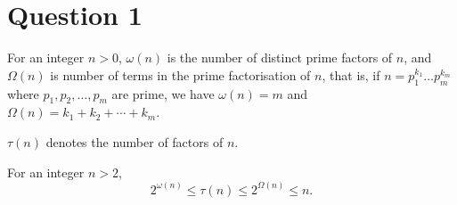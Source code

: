 \documentclass{unswmaths}
\begin{document}
\fancyfoot[r]{\today}

\section*{Question 1}

\begin{unswdef}
    For an integer $n > 0$, $\omega(n)$ is the number of distinct prime factors of $n$, and $\Omega(n)$
    is number of terms in the prime factorisation of $n$, that is, if $n = p_1^{k_1}\ldots p_m^{k_m}$
    where $p_1,p_2,\ldots,p_m$ are prime, we have $\omega(n) = m$ and $\Omega(n) = k_1+k_2+\cdots+k_m$.
    
    $\tau(n)$ denotes the number of factors of $n$.
\end{unswdef}
\begin{unswlem}
    For an integer $n > 2$,
    \begin{equation*}
        2^{\omega(n)}\leq \tau(n) \leq 2^{\Omega(n)}\leq n.
    \end{equation*}
\end{unswlem}
\end{document}

